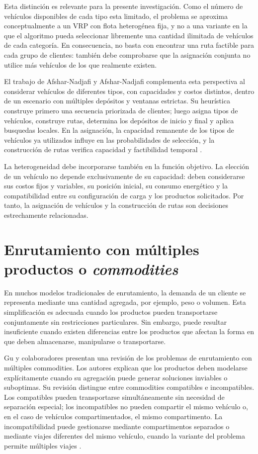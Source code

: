 Esta distinción es relevante para la presente investigación. Como el número de vehículos disponibles de cada tipo esta limitado, el problema se aproxima conceptualmente a un VRP con flota heterogénea fija, y no a una variante en la que el algoritmo pueda seleccionar libremente una cantidad ilimitada de vehículos de cada categoría. En consecuencia, no basta con encontrar una ruta factible para cada grupo de clientes: también debe comprobarse que la asignación conjunta no utilice más vehículos de los que realmente existen.

El trabajo de Afshar-Nadjafi y Afshar-Nadjafi complementa esta perspectiva al considerar vehículos de diferentes tipos, con capacidades y costos distintos, dentro de un escenario con múltiples depósitos y ventanas estrictas. Su heurística construye primero una secuencia priorizada de clientes; luego asigna tipos de vehículos, construye rutas, determina los depósitos de inicio y final y aplica busquedas locales. En la asignación, la capacidad remanente de los tipos de vehículos ya utilizados influye en las probabilidades de selección, y la construcción de rutas verifica capacidad y factibilidad temporal \cite{afshar2017}.

La heterogeneidad debe incorporarse también en la función objetivo. La elección de un vehículo no depende exclusivamente de su capacidad: deben considerarse sus costos fijos y variables, su posición inicial, su consumo energético y la compatibilidad entre su configuración de carga y los productos solicitados. Por tanto, la asignación de vehículos y la construcción de rutas son decisiones estrechamente relacionadas.

\section{Enrutamiento con múltiples productos o \textit{commodities}}
\label{sec:multi_commodity}

En muchos modelos tradicionales de enrutamiento, la demanda de un cliente se representa mediante una cantidad agregada, por ejemplo, peso o volumen. Esta simplificación es adecuada cuando los productos pueden transportarse conjuntamente sin restricciones particulares. Sin embargo, puede resultar insuficiente cuando existen diferencias entre los productos que afectan la forma en que deben almacenarse, manipularse o transportarse.

Gu y colaboradores presentan una revisión de los problemas de enrutamiento con múltiples commodities. Los autores explican que los productos deben modelarse explícitamente cuando su agregación puede generar soluciones inviables o suboptimas. Su revisión distingue entre commodities compatibles e incompatibles. Los compatibles pueden transportarse simultáneamente sin necesidad de separación especial; los incompatibles no pueden compartir el mismo vehículo o, en el caso de vehículos compartimentados, el mismo compartimento. La incompatibilidad puede gestionarse mediante compartimentos separados o mediante viajes diferentes del mismo vehículo, cuando la variante del problema permite múltiples viajes \cite{gu2024}.

